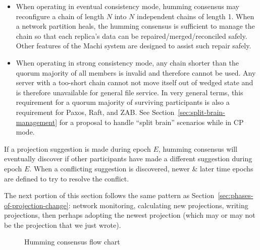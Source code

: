 \documentclass[preprint,10pt]{sigplanconf}
\begin{document}
\begin{itemize}

\item When operating in eventual consistency mode, humming
consensus may reconfigure a chain of length $N$ into $N$
independent chains of length 1.  When a network partition heals, the
humming consensus is sufficient to manage the chain so that each
replica's data can be repaired/merged/reconciled safely.
Other features of the Machi system are designed to assist such
repair safely.

\item When operating in strong consistency mode, any
chain shorter than the quorum majority of
all members is invalid and therefore cannot be used.  Any server with
a too-short chain cannot not move itself out
of wedged state and is therefore unavailable for general file service.
In very general terms, this requirement for a quorum
majority of surviving participants is also a requirement for Paxos,
Raft, and ZAB. See Section~\ref{sec:split-brain-management} for a
proposal to handle ``split brain'' scenarios while in CP mode.

\end{itemize}

If a projection suggestion is made during epoch $E$, humming consensus
will eventually discover if other participants have made a different
suggestion during epoch $E$.  When a conflicting suggestion is
discovered, newer \& later time epochs are defined to try to resolve
the conflict.

The next portion of this section follows the same pattern as
Section~\ref{sec:phases-of-projection-change}: network monitoring,
calculating new projections, writing projections, then perhaps
adopting the newest projection (which may or may not be the projection
that we just wrote).

\begin{figure}[htp]
\caption{Humming consensus flow chart}
\label{fig:flowchart}
\end{figure}
\end{document}
